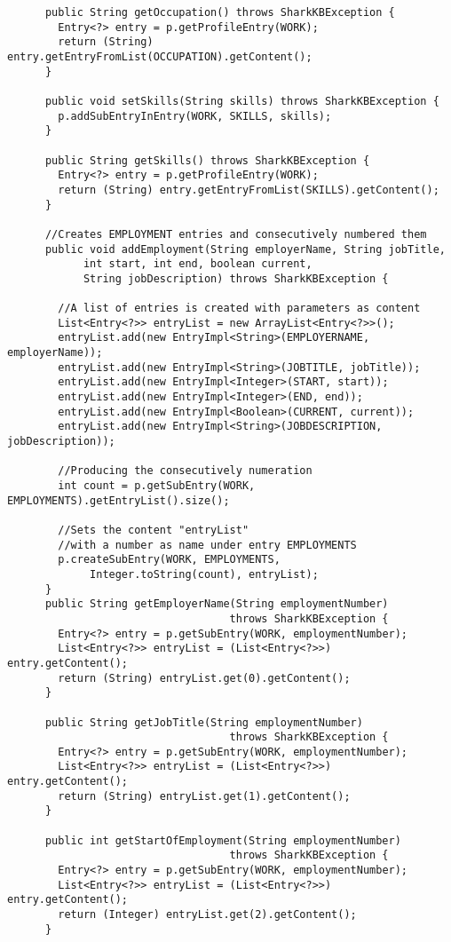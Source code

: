 \documentclass[12pt]{article}
\begin{document}
\begin{verbatim}
      public String getOccupation() throws SharkKBException {
        Entry<?> entry = p.getProfileEntry(WORK);
        return (String) entry.getEntryFromList(OCCUPATION).getContent();
      }

      public void setSkills(String skills) throws SharkKBException {
        p.addSubEntryInEntry(WORK, SKILLS, skills);
      }

      public String getSkills() throws SharkKBException {
        Entry<?> entry = p.getProfileEntry(WORK);
        return (String) entry.getEntryFromList(SKILLS).getContent();
      }

      //Creates EMPLOYMENT entries and consecutively numbered them
      public void addEmployment(String employerName, String jobTitle,
            int start, int end, boolean current,
            String jobDescription) throws SharkKBException {

        //A list of entries is created with parameters as content
        List<Entry<?>> entryList = new ArrayList<Entry<?>>();
        entryList.add(new EntryImpl<String>(EMPLOYERNAME, employerName));
        entryList.add(new EntryImpl<String>(JOBTITLE, jobTitle));
        entryList.add(new EntryImpl<Integer>(START, start));
        entryList.add(new EntryImpl<Integer>(END, end));
        entryList.add(new EntryImpl<Boolean>(CURRENT, current));
        entryList.add(new EntryImpl<String>(JOBDESCRIPTION, jobDescription));

        //Producing the consecutively numeration 
        int count = p.getSubEntry(WORK, EMPLOYMENTS).getEntryList().size();

        //Sets the content "entryList"
        //with a number as name under entry EMPLOYMENTS 
        p.createSubEntry(WORK, EMPLOYMENTS,
             Integer.toString(count), entryList);
      }
      public String getEmployerName(String employmentNumber) 
                                   throws SharkKBException {
        Entry<?> entry = p.getSubEntry(WORK, employmentNumber);
        List<Entry<?>> entryList = (List<Entry<?>>) entry.getContent();
        return (String) entryList.get(0).getContent();
      }

      public String getJobTitle(String employmentNumber) 
                                   throws SharkKBException {
        Entry<?> entry = p.getSubEntry(WORK, employmentNumber);
        List<Entry<?>> entryList = (List<Entry<?>>) entry.getContent();
        return (String) entryList.get(1).getContent();
      }

      public int getStartOfEmployment(String employmentNumber) 
                                   throws SharkKBException {
        Entry<?> entry = p.getSubEntry(WORK, employmentNumber);
        List<Entry<?>> entryList = (List<Entry<?>>) entry.getContent();
        return (Integer) entryList.get(2).getContent();
      }


\end{verbatim}
\end{document}
